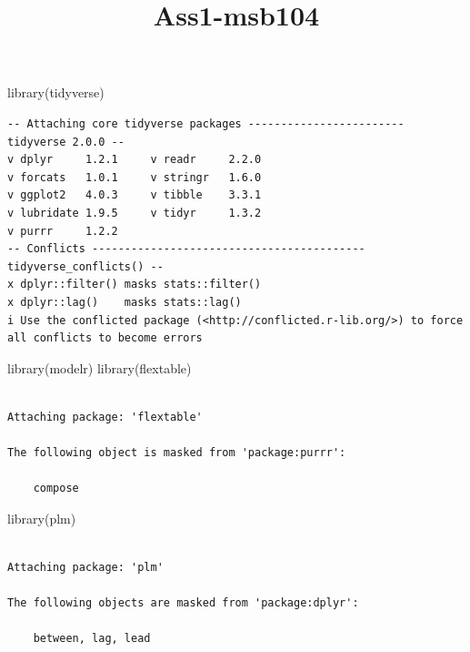 \documentclass[
  letterpaper,
  DIV=11,
  numbers=noendperiod]{scrartcl}
\title{Ass1-msb104}
\author{}
\date{}
\newenvironment{Shaded}{\begin{snugshade}}{\end{snugshade}}
\newcommand{\FunctionTok}[1]{\textcolor[rgb]{0.28,0.35,0.67}{#1}}
\newcommand{\NormalTok}[1]{\textcolor[rgb]{0.00,0.23,0.31}{#1}}
\begin{document}
\maketitle


\subsection{}\label{section}

\begin{Shaded}
\begin{Highlighting}[]
\FunctionTok{library}\NormalTok{(tidyverse)}
\end{Highlighting}
\end{Shaded}

\begin{verbatim}
-- Attaching core tidyverse packages ------------------------ tidyverse 2.0.0 --
v dplyr     1.2.1     v readr     2.2.0
v forcats   1.0.1     v stringr   1.6.0
v ggplot2   4.0.3     v tibble    3.3.1
v lubridate 1.9.5     v tidyr     1.3.2
v purrr     1.2.2     
-- Conflicts ------------------------------------------ tidyverse_conflicts() --
x dplyr::filter() masks stats::filter()
x dplyr::lag()    masks stats::lag()
i Use the conflicted package (<http://conflicted.r-lib.org/>) to force all conflicts to become errors
\end{verbatim}

\begin{Shaded}
\begin{Highlighting}[]
\FunctionTok{library}\NormalTok{(modelr)}
\FunctionTok{library}\NormalTok{(flextable)}
\end{Highlighting}
\end{Shaded}

\begin{verbatim}

Attaching package: 'flextable'

The following object is masked from 'package:purrr':

    compose
\end{verbatim}

\begin{Shaded}
\begin{Highlighting}[]
\FunctionTok{library}\NormalTok{(plm)}
\end{Highlighting}
\end{Shaded}

\begin{verbatim}

Attaching package: 'plm'

The following objects are masked from 'package:dplyr':

    between, lag, lead
\end{verbatim}
\end{document}
